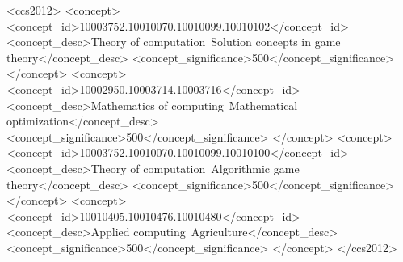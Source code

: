 \documentclass[manuscript, screen]{acmart}
\begin{document}
\begin{CCSXML}
<ccs2012>
   <concept>
       <concept_id>10003752.10010070.10010099.10010102</concept_id>
       <concept_desc>Theory of computation~Solution concepts in game theory</concept_desc>
       <concept_significance>500</concept_significance>
       </concept>
   <concept>
       <concept_id>10002950.10003714.10003716</concept_id>
       <concept_desc>Mathematics of computing~Mathematical optimization</concept_desc>
       <concept_significance>500</concept_significance>
       </concept>
   <concept>
       <concept_id>10003752.10010070.10010099.10010100</concept_id>
       <concept_desc>Theory of computation~Algorithmic game theory</concept_desc>
       <concept_significance>500</concept_significance>
       </concept>
   <concept>
       <concept_id>10010405.10010476.10010480</concept_id>
       <concept_desc>Applied computing~Agriculture</concept_desc>
       <concept_significance>500</concept_significance>
       </concept>
 </ccs2012>
\end{CCSXML}

\keywords{}


\maketitle
\end{document}
